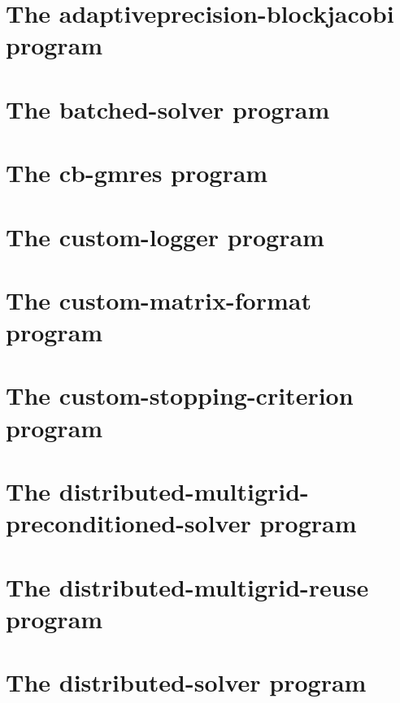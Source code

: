 \let\mypdfximage\pdfximage\def\pdfximage{\immediate\mypdfximage}\documentclass[twoside]{book}
\newcommand{\+}{\discretionary{\mbox{\scriptsize$\hookleftarrow$}}{}{}}
\begin{document}
\chapter{The adaptiveprecision-\/blockjacobi program}
\label{adaptiveprecision_blockjacobi}

\chapter{The batched-\/solver program}
\label{batched_solver}

\chapter{The cb-\/gmres program}
\label{cb_gmres}

\chapter{The custom-\/logger program}
\label{custom_logger}

\chapter{The custom-\/matrix-\/format program}
\label{custom_matrix_format}

\chapter{The custom-\/stopping-\/criterion program}
\label{custom_stopping_criterion}

\chapter{The distributed-\/multigrid-\/preconditioned-\/solver program}
\label{distributed_multigrid_preconditioned_solver}

\chapter{The distributed-\/multigrid-\/reuse program}
\label{distributed_multigrid_reuse}

\chapter{The distributed-\/solver program}
\label{distributed_solver}

\end{document}
